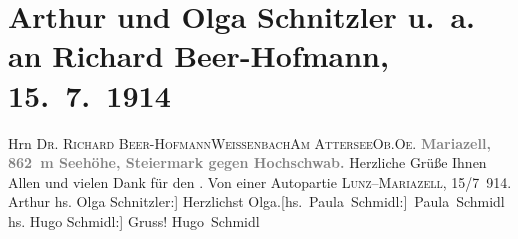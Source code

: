 

         
         \renewcommand{\erwaehntePersonen}{Personen: Richard Beer-Hofmann, Hugo Schmidl, Paula Schmidl, Olga Schnitzler}
         \renewcommand{\erwaehnteOrte}{Orte: Attersee, Hochschwab, Lunz am See, Mariazell, Oberösterreich, Steiermark, Weißenbach am Attersee, Wien}
         \renewcommand{\erwaehnteWerke}{}
               \section[Arthur und Olga Schnitzler u. a. an Richard Beer-Hofmann, 15. 7. 1914]{ Arthur und Olga Schnitzler u. a. an Richard Beer-Hofmann,
               15. 7. 1914}\nopagebreak{}\rehead{ }\begin{ledgroupsized}[t]{13cm}\normalsize\beginnumbering \toendnotes[C]{\smallbreak\pagebreak[2]} 
\toendnotes[C]{\smallbreak}\pstart{}{\pb}Hrn \textsc{Dr. Richard
                     Beer-Hofmann}\pend{}\pstart{}\textsc{Weissenbach}\pend{}\pstart{}\textsc{Am Attersee}\pend{}\pstart{}\textsc{Ob.Oe.}\pend{}{\bigskip}\pstart
           \noindent{}\centering{}{\pb}\textcolor{gray}{\textbf{Mariazell, 862 m Seehöhe, Steiermark gegen Hochschwab.}}\pend
           \pstart
           {\pb}Herzliche Grüße Ihnen Allen und vielen Dank für den
                  \label{K_L02186-1v}\label{K_L02186-1h}.\pend
           \pstart
           Von einer Autopartie \textsc{Lunz}–\textsc{Mariazell}, 15/7 914.\pend
           \pstart \spacefill\mbox{Arthur}\pend{}\pstart
           \noindent{}{[}hs. Olga Schnitzler:{]} Herzlichst\pend
           \pstart \spacefill\mbox{Olga.}\pend{}\pstart \spacefill\mbox{{[}hs. Paula Schmidl:{]} Paula Schmidl}\pend{}\pstart
           \noindent{}{[}hs. Hugo Schmidl:{]} Gruss!\pend
           \pstart \spacefill\mbox{Hugo Schmidl}\pend{}
         

\end{ledgroupsized}
